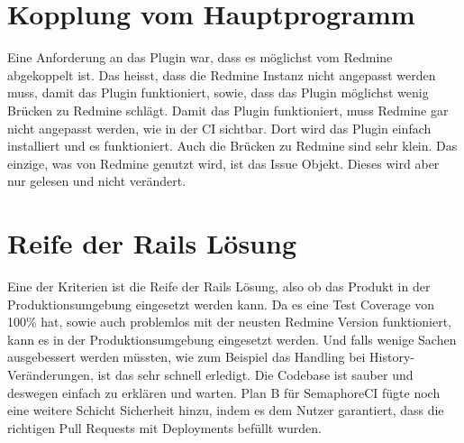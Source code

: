 \section{Kopplung vom Hauptprogramm}
Eine Anforderung an das Plugin war, dass es möglichst vom Redmine abgekoppelt ist. Das heisst, dass die
Redmine Instanz nicht angepasst werden muss, damit das Plugin funktioniert, sowie, dass das Plugin möglichst
wenig Brücken zu Redmine schlägt. \newline
Damit das Plugin funktioniert, muss Redmine gar nicht angepasst werden, wie in der CI sichtbar. Dort wird
das Plugin einfach installiert und es funktioniert. Auch die Brücken zu Redmine sind sehr klein. Das einzige,
was von Redmine genutzt wird, ist das Issue Objekt. Dieses wird aber nur gelesen und nicht verändert.

\section{Reife der Rails Lösung}
Eine der Kriterien ist die Reife der Rails Lösung, also ob das Produkt in der Produktionsumgebung
eingesetzt werden kann. \newline
Da es eine Test Coverage von 100\% hat, sowie auch problemlos mit der neusten Redmine Version funktioniert,
kann es in der Produktionsumgebung eingesetzt werden. Und falls wenige Sachen ausgebessert werden müssten,
wie zum Beispiel das Handling bei History-Veränderungen, ist das sehr schnell erledigt. Die Codebase ist
sauber und deswegen einfach zu erklären und warten. \newline
Plan B für SemaphoreCI fügte noch eine weitere Schicht Sicherheit hinzu, indem es dem Nutzer garantiert,
dass die richtigen Pull Requests mit Deployments befüllt wurden.
